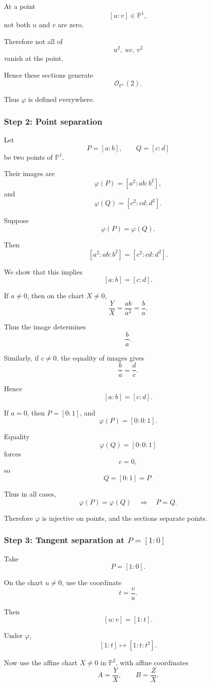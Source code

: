 \documentclass[12pt,a4paper]{article}
\theoremstyle{notespace}
\begin{document}
At a point
\[
[u:v]\in\mathbb P^1,
\]
not both \(u\) and \(v\) are zero.

Therefore not all of
\[
u^2,\ uv,\ v^2
\]
vanish at the point.

Hence these sections generate
\[
\mathcal O_{\mathbb P^1}(2).
\]

Thus \(\varphi\) is defined everywhere.

\subsubsection*{Step 2: Point separation}

Let
\[
P=[a:b],
\qquad
Q=[c:d]
\]
be two points of \(\mathbb P^1\).

Their images are
\[
\varphi(P)=[a^2:ab:b^2],
\]
and
\[
\varphi(Q)=[c^2:cd:d^2].
\]

Suppose
\[
\varphi(P)=\varphi(Q).
\]

Then
\[
[a^2:ab:b^2]=[c^2:cd:d^2].
\]

We show that this implies
\[
[a:b]=[c:d].
\]

If \(a\neq0\), then on the chart \(X\neq0\),
\[
\frac{Y}{X}=\frac{ab}{a^2}=\frac ba.
\]

Thus the image determines
\[
\frac ba.
\]

Similarly, if \(c\neq0\), the equality of images gives
\[
\frac ba=\frac dc.
\]

Hence
\[
[a:b]=[c:d].
\]

If \(a=0\), then \(P=[0:1]\), and
\[
\varphi(P)=[0:0:1].
\]

Equality
\[
\varphi(Q)=[0:0:1]
\]
forces
\[
c=0,
\]
so
\[
Q=[0:1]=P.
\]

Thus in all cases,
\[
\varphi(P)=\varphi(Q)
\quad\Longrightarrow\quad
P=Q.
\]

Therefore \(\varphi\) is injective on points, and the sections separate
points.

\subsubsection*{Step 3: Tangent separation at \texorpdfstring{$P=[1:0]$}{P=[1:0]}}

Take
\[
P=[1:0].
\]

On the chart \(u\neq0\), use the coordinate
\[
t=\frac vu.
\]

Then
\[
[u:v]=[1:t].
\]

Under \(\varphi\),
\[
[1:t]\longmapsto [1:t:t^2].
\]

Now use the affine chart \(X\neq0\) in \(\mathbb P^2\), with affine
coordinates
\[
A=\frac YX,
\qquad
B=\frac ZX.
\]
\end{document}
